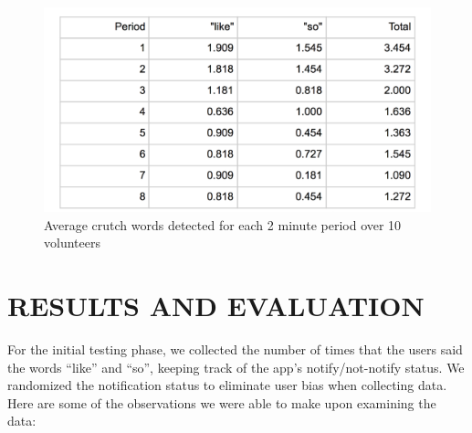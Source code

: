 \documentclass{sigchi}
\begin{document}
\begin{figure}[!h]
\centering
\includegraphics[width=0.9\columnwidth]{table}
\caption{Average crutch words detected for each 2 minute period over 10 volunteers
}
\label{fig:figure3}
\end{figure}


\section{RESULTS AND EVALUATION}

For the initial testing phase, we collected the number of times that the users said the words “like” and “so”, keeping track of the app’s notify/not-notify status. We randomized the notification status to  eliminate user bias when collecting data. Here are some of the observations we were able to make upon examining the data:
\end{document}
